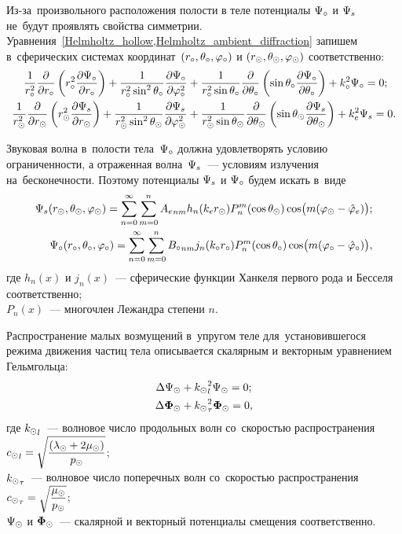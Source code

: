 Из-за~произвольного расположения полости в теле потенциалы $\P\c$ и $\P_s$ не~будут проявлять свойства симметрии.
Уравнения~\cref{Helmholtz_hollow,Helmholtz_ambient_diffraction} запишем в~сферических системах координат~$(r\c, \Q\c, \f\c)$ и $(r\s, \Q\s, \f\s)$ соответственно:
\begin{align}
\fr1{r\c^2}\fr\de{\de r\c}\left(r\c^2 \fr{\de\P\c}{\de r\c}\right) + \fr1{r\c^2\sin^2\Q\c}\fr{\de\P\c}{\de\f\c^2} &+ \fr1{r\c^2\sin\Q\c}\fr\de{\de\Q\c} \left(\sin\Q\c \fr{\de\P\c}{\de\Q\c}\right) + k\c^2\P\c = 0;\\
\fr1{r\s^2}\fr\de{\de r\s}\left(r\s^2 \fr{\de\P_s}{\de r\s}\right) + \fr1{r\s^2\sin^2\Q\s}\fr{\de\P_s}{\de\f\s^2} &+ \fr1{r\s^2\sin\Q\s}\fr\de{\de\Q\s} \left(\sin\Q\s \fr{\de\P_s}{\de\Q\s}\right) + k\en^2\P_s = 0.
\end{align}

Звуковая волна в~полости тела~$\P\c$ должна удовлетворять условию ограниченности, а отраженная волна~$\P_s$~--- условиям излучения на~бесконечности. Поэтому потенциалы $\P_s$ и $\P\c$ будем искать в~виде 
\begin{align}\P_s(r\s, \Q\s, \f\s) = \sum\limits_{n = 0}^\infty \sum\limits_{m = 0}^n {A\en}_{nm} h_n(k\en r\s) P_n^m(\cos\Q\s)\cos\bigl(m(\f\s-\hfe)\bigr);\\
\P\c(r\c, \Q\c, \f\c) = \sum\limits_{n = 0}^\infty \sum\limits_{m = 0}^n {B\c}_{nm} j_n(k\c r\c) P_n^m(\cos\Q\c)\cos\bigl(m(\f\c-\hfc)\bigr),
\end{align}
где $h_n(x)$ и $j_n(x)$~--- сферические функции Ханкеля первого рода и Бесселя соответственно; \\
$P_n(x)$~--- многочлен Лежандра степени $n$.





Распространение малых возмущений в~упругом теле для~установившегося режима движения частиц тела описывается скалярным и векторным уравнением Гельмгольца:
\begin{align}
\Lap\P\s &+ {k\s}_l^2\P\s = 0;\label{Helmholtz_scalar}\\
\Lap\F\s &+ {k\s}_\t^2\F\s = 0,\label{Helmholtz_vector}
\end{align}
где ${k\s}_l$~--- волновое число продольных волн со~скоростью распространения \break 
${c\s}_l = \sqrt{\df{(\la\s + 2\mu\s)}{p\s}}$;\\
${k\s}_\t$~--- волновое число поперечных волн со~скоростью распространения \\
${c\s}_\t = \sqrt{\df{\mu\s}{p\s}}$;\\
$\P\s$ и $\F\s$~--- скалярной и векторный потенциалы смещения соответственно.

